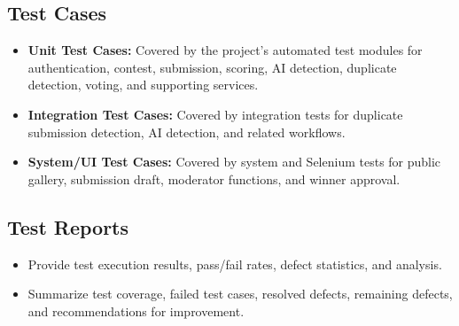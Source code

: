 \subsection{Test Cases}
\label{subsec:test-cases}

\begin{itemize}[leftmargin=1.5em, nosep]
    \item \textbf{Unit Test Cases:} Covered by the project's automated test modules for authentication, contest, submission, scoring, AI detection, duplicate detection, voting, and supporting services.
    \item \textbf{Integration Test Cases:} Covered by integration tests for duplicate submission detection, AI detection, and related workflows.
    \item \textbf{System/UI Test Cases:} Covered by system and Selenium tests for public gallery, submission draft, moderator functions, and winner approval.
\end{itemize}

\subsection{Test Reports}
\label{subsec:test-reports}

\begin{itemize}[leftmargin=1.5em, nosep]
    \item Provide test execution results, pass/fail rates, defect statistics, and analysis.
    \item Summarize test coverage, failed test cases, resolved defects, remaining defects, and recommendations for improvement.
\end{itemize}
